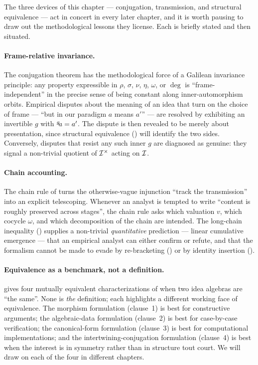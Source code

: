 The three devices of this chapter --- conjugation, transmission, and
structural equivalence --- act in concert in every later chapter, and
it is worth pausing to draw out the methodological lessons they
license. Each is briefly stated and then situated.

\paragraph{Frame-relative invariance.} The conjugation theorem has the
methodological force of a Galilean invariance principle: any property
expressible in $\rho$, $\sigma$, $\nu$, $\eta$, $\omega$, or $\deg$ is
``frame-independent'' in the precise sense of being constant along
inner-automorphism orbits. Empirical disputes about the meaning of an
idea that turn on the choice of frame --- ``but in our paradigm $a$
means $a'$'' --- are resolved by exhibiting an invertible $g$ with
${}^{g}\!a = a'$. The dispute is then revealed to be merely about
presentation, since structural equivalence ()
will identify the two sides. Conversely, disputes that resist any
such inner $g$ are diagnosed as genuine: they signal a non-trivial
quotient of $\mathcal{I}^{\times}$ acting on $\mathcal{I}$.

\paragraph{Chain accounting.} The chain rule of 
turns the otherwise-vague injunction ``track the transmission'' into
an explicit telescoping. Whenever an analyst is tempted to write
``content is roughly preserved across stages'', the chain rule asks
which valuation $v$, which cocycle $\omega$, and which decomposition
of the chain are intended. The long-chain inequality
() supplies a non-trivial \emph{quantitative}
prediction --- linear cumulative emergence --- that an empirical
analyst can either confirm or refute, and that the formalism cannot
be made to evade by re-bracketing () or by
identity insertion ().

\paragraph{Equivalence as a benchmark, not a definition.}
 gives four mutually equivalent
characterizations of when two idea algebras are ``the same''. None is
\emph{the} definition; each highlights a different working face of
equivalence. The morphism formulation (clause~1) is best for
constructive arguments; the algebraic-data formulation (clause~2) is
best for case-by-case verification; the canonical-form formulation
(clause~3) is best for computational implementations; and the
intertwining-conjugation formulation (clause~4) is best when the
interest is in symmetry rather than in structure tout court. We will
draw on each of the four in different chapters.

